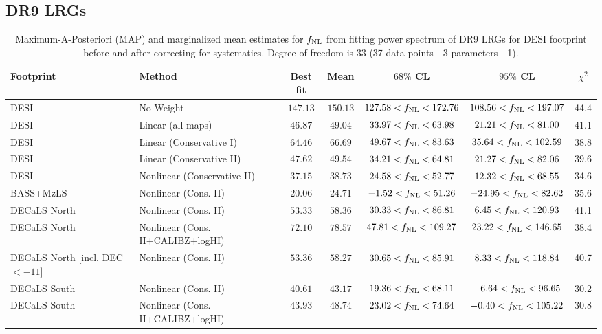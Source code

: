 \subsection{DR9 LRGs}
\begin{table}
  \begin{center}
    \caption{Maximum-A-Posteriori (MAP) and marginalized mean estimates for $f_{\rm NL}$ from fitting power spectrum of DR9 LRGs for DESI footprint before and after correcting for systematics. Degree of freedom is 33 (37 data points - 3 parameters - 1).}
    \label{tab:dr9method}
    \begin{tabular}{llccccc}
    \hline
    \hline
Footprint   & Method & 	Best fit  & Mean & $ 68\%$ CL & $ 95\%$ CL & $\chi^{2}$ \\
    \hline
DESI & No Weight                               & $147.13$& $150.13$& $127.58<f_{\rm NL}<172.76$& $108.56<f_{\rm NL}<197.07$ &   44.4\\
DESI &Linear (all maps)                                & $ 46.87$& $ 49.04$& $ 33.97<f_{\rm NL}< 63.98$& $ 21.21<f_{\rm NL}< 81.00$ &   41.1\\
DESI &Linear (Conservative I)                          & $ 64.46$& $ 66.69$& $ 49.67<f_{\rm NL}< 83.63$& $ 35.64<f_{\rm NL}<102.59$ &   38.8\\
DESI &Linear (Conservative II)                         & $ 47.62$& $ 49.54$& $ 34.21<f_{\rm NL}< 64.81$& $ 21.27<f_{\rm NL}< 82.06$ &   39.6\\
DESI & Nonlinear (Conservative II)                    & $ 37.15$& $ 38.73$& $ 24.58<f_{\rm NL}< 52.77$& $ 12.32<f_{\rm NL}< 68.55$ &   34.6\\
\hline
BASS+MzLS & Nonlinear (Cons. II)          & $ 20.06$& $ 24.71$& $ -1.52<f_{\rm NL}< 51.26$& $-24.95<f_{\rm NL}< 82.62$ &   35.6\\
DECaLS North    & Nonlinear (Cons. II)                               & $ 53.33$& $ 58.36$& $ 30.33<f_{\rm NL}< 86.81$& $  6.45<f_{\rm NL}<120.93$ &   41.1\\
DECaLS North   & Nonlinear (Cons. II+CALIBZ+logHI)             & $ 72.10$& $ 78.57$& $ 47.81<f_{\rm NL}<109.27$& $ 23.22<f_{\rm NL}<146.65$ &   38.4\\
DECaLS North [incl. DEC $< -11$] & Nonlinear (Cons. II)                & $ 53.36$& $ 58.27$& $ 30.65<f_{\rm NL}< 85.91$& $  8.33<f_{\rm NL}<118.84$ &   40.7\\
DECaLS South    & Nonlinear (Cons. II)                               & $ 40.61$& $ 43.17$& $ 19.36<f_{\rm NL}< 68.11$& $ -6.64<f_{\rm NL}< 96.65$ &   30.2\\
DECaLS South & Nonlinear (Cons. II+CALIBZ+logHI)            & $ 43.93$& $ 48.74$& $ 23.02<f_{\rm NL}< 74.64$& $ -0.40<f_{\rm NL}<105.22$ &   30.8\\

\end{tabular}
\end{center}
\end{table}
